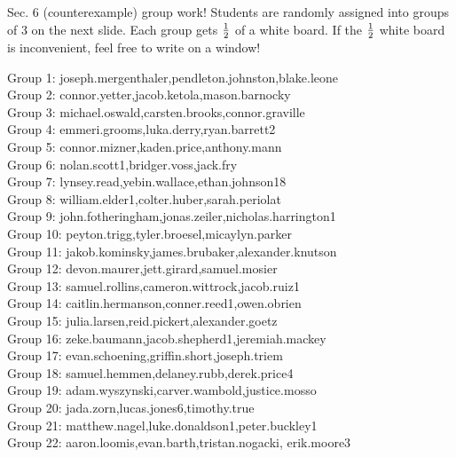 \documentclass[10pt]{beamer}
\begin{document}
\begin{frame}[standout]

\alert{Sec. 6 (counterexample) group work!}
\vfill
Students are randomly assigned into groups of 3 on the next slide.
\vfill 
Each group gets $\frac{1}{2}$ of a white board.
\vfill
If the  $\frac{1}{2}$ white board is inconvenient, feel free to write on a window! 
\end{frame}

\begin{frame}
\footnotesize
Group 1: joseph.mergenthaler,pendleton.johnston,blake.leone\\
Group 2: connor.yetter,jacob.ketola,mason.barnocky\\
Group 3: michael.oswald,carsten.brooks,connor.graville\\
Group 4: emmeri.grooms,luka.derry,ryan.barrett2\\
Group 5: connor.mizner,kaden.price,anthony.mann\\
Group 6: nolan.scott1,bridger.voss,jack.fry\\
Group 7: lynsey.read,yebin.wallace,ethan.johnson18\\
Group 8: william.elder1,colter.huber,sarah.periolat\\
Group 9: john.fotheringham,jonas.zeiler,nicholas.harrington1\\
Group 10: peyton.trigg,tyler.broesel,micaylyn.parker\\
Group 11: jakob.kominsky,james.brubaker,alexander.knutson\\
Group 12: devon.maurer,jett.girard,samuel.mosier\\
Group 13: samuel.rollins,cameron.wittrock,jacob.ruiz1\\
Group 14: caitlin.hermanson,conner.reed1,owen.obrien\\
Group 15: julia.larsen,reid.pickert,alexander.goetz\\
Group 16: zeke.baumann,jacob.shepherd1,jeremiah.mackey\\
Group 17: evan.schoening,griffin.short,joseph.triem\\
Group 18: samuel.hemmen,delaney.rubb,derek.price4\\
Group 19: adam.wyszynski,carver.wambold,justice.mosso\\
Group 20: jada.zorn,lucas.jones6,timothy.true\\
Group 21: matthew.nagel,luke.donaldson1,peter.buckley1\\
Group 22: aaron.loomis,evan.barth,tristan.nogacki, erik.moore3
\end{frame}
\end{document}
